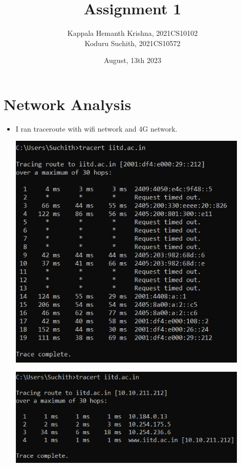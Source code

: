 \documentclass{article}
\title{Assignment 1}
\author{Kappala Hemanth Krishna, 2021CS10102 \\ Koduru Suchith, 2021CS10572}
\date{August, 13th 2023}
\begin{document}
\maketitle

\section{Network Analysis}

\begin{itemize}
\item I ran traceroute with wifi network and 4G network. 



\begin{center}
\centering
    \includegraphics[width=0.90\textwidth]{4G_ip6.jpg}
\end{center}

\begin{center}
\centering
    \includegraphics[width=0.90\textwidth]{wifi_ip4.png}
\end{center}
\end{itemize}
\end{document}
